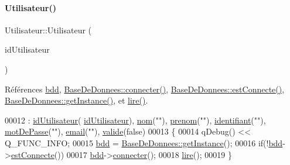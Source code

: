 \paragraph{\texorpdfstring{Utilisateur()}{Utilisateur()}\hspace{0.1cm}{\footnotesize\ttfamily [2/2]}}
{\footnotesize\ttfamily Utilisateur\+::\+Utilisateur (\begin{DoxyParamCaption}\item[{Q\+String}]{id\+Utilisateur }\end{DoxyParamCaption})}



Références \hyperlink{class_utilisateur_a94fa14e95bd90358fb67eca0170e1724}{bdd}, \hyperlink{class_base_de_donnees_ac20da193923a9bfea5e38ee5a54820cd}{Base\+De\+Donnees\+::connecter()}, \hyperlink{class_base_de_donnees_a00388973f3ec42e5c8e76e7af7e124b2}{Base\+De\+Donnees\+::est\+Connecte()}, \hyperlink{class_base_de_donnees_a80028aa2b6b4fbf30fb2e36357b7d3d3}{Base\+De\+Donnees\+::get\+Instance()}, et \hyperlink{class_utilisateur_aa7d1a92ff4e06e9d302369f6c48884e1}{lire()}.


\begin{DoxyCode}
00012                                               : \hyperlink{class_utilisateur_ae1763e7a52c82c63506bc4160cdabb20}{idUtilisateur}(
      \hyperlink{class_utilisateur_ae1763e7a52c82c63506bc4160cdabb20}{idUtilisateur}), \hyperlink{class_utilisateur_a1096e809aca4b7cf453a7af93cb72502}{nom}(\textcolor{stringliteral}{""}), \hyperlink{class_utilisateur_a1dd0779807b19298f30f39d9c371170f}{prenom}(\textcolor{stringliteral}{""}), \hyperlink{class_utilisateur_a1e79e47202a2c716346f47adbbeb2511}{identifiant}(\textcolor{stringliteral}{""}), 
      \hyperlink{class_utilisateur_a4f6a17d0fb5c231bcb414396236a056f}{motDePasse}(\textcolor{stringliteral}{""}), \hyperlink{class_utilisateur_a2f45443ce5277a5e6baefe5121e66555}{email}(\textcolor{stringliteral}{""}), \hyperlink{class_utilisateur_ad8b12c53bc07491a54895d48631ef6a2}{valide}(\textcolor{keyword}{false})
00013 \{
00014     qDebug() << Q\_FUNC\_INFO;
00015     \hyperlink{class_utilisateur_a94fa14e95bd90358fb67eca0170e1724}{bdd} = \hyperlink{class_base_de_donnees_a80028aa2b6b4fbf30fb2e36357b7d3d3}{BaseDeDonnees::getInstance}();
00016     \textcolor{keywordflow}{if}(!\hyperlink{class_utilisateur_a94fa14e95bd90358fb67eca0170e1724}{bdd}->\hyperlink{class_base_de_donnees_a00388973f3ec42e5c8e76e7af7e124b2}{estConnecte}())
00017         \hyperlink{class_utilisateur_a94fa14e95bd90358fb67eca0170e1724}{bdd}->\hyperlink{class_base_de_donnees_ac20da193923a9bfea5e38ee5a54820cd}{connecter}();
00018     \hyperlink{class_utilisateur_aa7d1a92ff4e06e9d302369f6c48884e1}{lire}();
00019 \}
\end{DoxyCode}
\mbox{\label{class_utilisateur_a6631539ceecd6140fe525eb91485537b}} 
